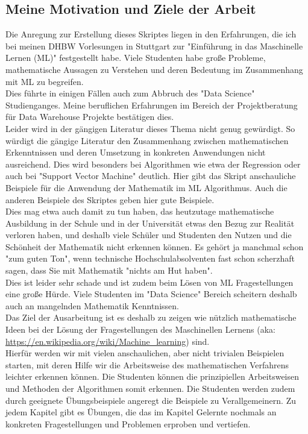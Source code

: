 \documentclass[12pt]{article}
\begin{document}
\subsection{Meine Motivation und Ziele der Arbeit}
Die Anregung zur Erstellung dieses Skriptes liegen in den Erfahrungen, die ich bei meinen DHBW Vorlesungen in Stuttgart zur "Einführung in das Maschinelle Lernen (ML)" festgestellt habe. Viele Studenten habe große Probleme, mathematische Aussagen zu Verstehen und deren Bedeutung im Zusammenhang mit ML zu begreifen.
\\
Dies führte in einigen Fällen auch zum Abbruch des "Data Science" Studienganges. Meine beruflichen Erfahrungen im Bereich der Projektberatung für Data Warehouse Projekte bestätigen dies.\\
Leider wird in der gängigen Literatur dieses Thema nicht genug gewürdigt. So würdigt die gängige Literatur den Zusammenhang zwischen mathematischen Erkenntnissen und deren Umsetzung in konkreten Anwendungen nicht ausreichend. Dies wird besonders bei Algorithmen wie etwa der Regression oder auch bei "Support Vector Machine" deutlich. Hier gibt das Skript anschauliche Beispiele für die Anwendung der Mathematik im ML Algorithmus. Auch die anderen Beispiele des Skriptes geben hier gute Beispiele. \\
Dies mag etwa auch damit zu tun haben, das heutzutage mathematische Ausbildung in der Schule und in der Universität etwas den Bezug zur Realität verloren haben, und deshalb viele Schüler und Studenten den Nutzen und die Schönheit der Mathematik nicht erkennen können. Es gehört ja manchmal schon "zum guten Ton", wenn technische Hochschulabsolventen fast schon scherzhaft sagen, dass Sie mit Mathematik "nichts am Hut haben".\\
Dies ist leider sehr schade und ist zudem beim Lösen von ML Fragestellungen eine große Hürde. Viele Studenten im "Data Science" Bereich scheitern deshalb auch an mangelnden Mathematik Kenntnissen.\\[0.2cm]
%
Das Ziel der Ausarbeitung ist es deshalb zu zeigen wie nützlich mathematische Ideen bei der Lösung der Fragestellungen des Maschinellen Lernens (aka: \url{https://en.wikipedia.org/wiki/Machine_learning}) sind.\\
Hierfür werden wir mit vielen anschaulichen, aber nicht trivialen Beispielen starten, mit deren Hilfe wir die Arbeitsweise des mathematischen Verfahrens leichter erkennen können. Die Studenten können die prinzipiellen Arbeitsweisen und Methoden der Algorithmen somit erkennen. Die Studenten werden zudem durch geeignete Übungsbeispiele angeregt die Beispiele zu Verallgemeinern. Zu jedem Kapitel gibt es Übungen, die das im Kapitel Gelernte nochmals an konkreten Fragestellungen und Problemen erproben und vertiefen. \\
\end{document}
